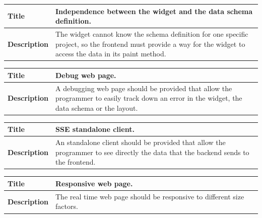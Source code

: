 \documentclass[12pt]{article}
\begin{document}
                \begin{tabularx}{\textwidth}{|l|X|}
                    \hline
                    \textbf{Title} & Independence between the widget and the
                    data schema definition. \\
                    \hline
                    \textbf{Description} & The widget cannot know the schema
                    definition for one specific project, so the frontend must
                    provide a way for the widget to access the data in its paint
                    method. \\
                    \hline
                \end{tabularx}

                \begin{tabularx}{\textwidth}{|l|X|}
                    \hline
                    \textbf{Title} & Debug web page. \\
                    \hline
                    \textbf{Description} & A debugging web page should be
                    provided that allow the programmer to easily track down an
                    error in the widget, the data schema or the layout. \\
                    \hline
                \end{tabularx}

                \begin{tabularx}{\textwidth}{|l|X|}
                    \hline
                    \textbf{Title} & SSE standalone client. \\
                    \hline
                    \textbf{Description} & An standalone client should be
                    provided that allow the programmer to see directly the data
                    that the backend sends to the frontend. \\
                    \hline
                \end{tabularx}

                \begin{tabularx}{\textwidth}{|l|X|}
                    \hline
                    \textbf{Title} & Responsive web page. \\
                    \hline
                    \textbf{Description} & The real time web page should be
                    responsive to different size factors. \\
                    \hline
                \end{tabularx}
\end{document}
